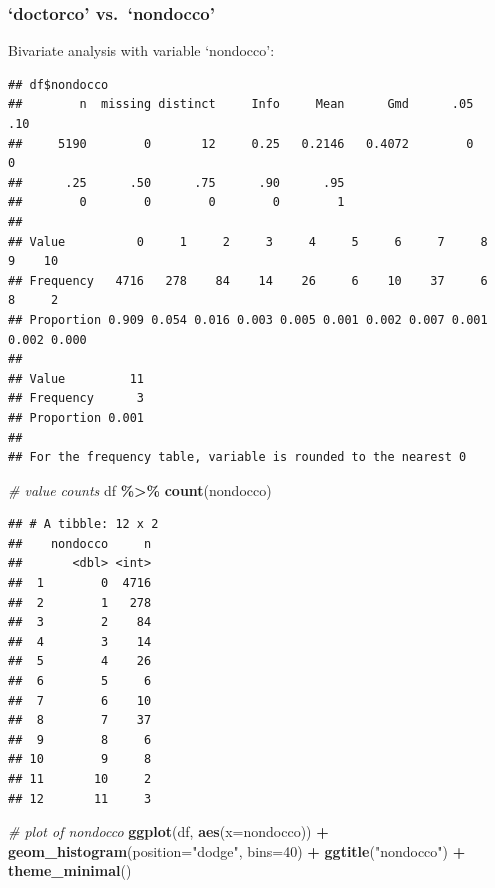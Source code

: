\documentclass[
]{article}
\newenvironment{Shaded}{\begin{snugshade}}{\end{snugshade}}
\newcommand{\AttributeTok}[1]{\textcolor[rgb]{0.13,0.29,0.53}{#1}}
\newcommand{\CommentTok}[1]{\textcolor[rgb]{0.56,0.35,0.01}{\textit{#1}}}
\newcommand{\DecValTok}[1]{\textcolor[rgb]{0.00,0.00,0.81}{#1}}
\newcommand{\FunctionTok}[1]{\textcolor[rgb]{0.13,0.29,0.53}{\textbf{#1}}}
\newcommand{\NormalTok}[1]{#1}
\newcommand{\SpecialCharTok}[1]{\textcolor[rgb]{0.81,0.36,0.00}{\textbf{#1}}}
\newcommand{\StringTok}[1]{\textcolor[rgb]{0.31,0.60,0.02}{#1}}
\begin{document}
\subsubsection{`doctorco' vs.~`nondocco'}\label{doctorco-vs.-nondocco}

Bivariate analysis with variable `nondocco':

\begin{Shaded}
\end{Shaded}

\begin{verbatim}
## df$nondocco 
##        n  missing distinct     Info     Mean      Gmd      .05      .10 
##     5190        0       12     0.25   0.2146   0.4072        0        0 
##      .25      .50      .75      .90      .95 
##        0        0        0        0        1 
##                                                                             
## Value          0     1     2     3     4     5     6     7     8     9    10
## Frequency   4716   278    84    14    26     6    10    37     6     8     2
## Proportion 0.909 0.054 0.016 0.003 0.005 0.001 0.002 0.007 0.001 0.002 0.000
##                 
## Value         11
## Frequency      3
## Proportion 0.001
## 
## For the frequency table, variable is rounded to the nearest 0
\end{verbatim}

\begin{Shaded}
\begin{Highlighting}[]
\CommentTok{\# value counts}
\NormalTok{df }\SpecialCharTok{\%\textgreater{}\%} \FunctionTok{count}\NormalTok{(nondocco)}
\end{Highlighting}
\end{Shaded}

\begin{verbatim}
## # A tibble: 12 x 2
##    nondocco     n
##       <dbl> <int>
##  1        0  4716
##  2        1   278
##  3        2    84
##  4        3    14
##  5        4    26
##  6        5     6
##  7        6    10
##  8        7    37
##  9        8     6
## 10        9     8
## 11       10     2
## 12       11     3
\end{verbatim}

\begin{Shaded}
\begin{Highlighting}[]
\CommentTok{\# plot of nondocco}
\FunctionTok{ggplot}\NormalTok{(df, }\FunctionTok{aes}\NormalTok{(}\AttributeTok{x=}\NormalTok{nondocco)) }\SpecialCharTok{+}
  \FunctionTok{geom\_histogram}\NormalTok{(}\AttributeTok{position=}\StringTok{"dodge"}\NormalTok{, }\AttributeTok{bins=}\DecValTok{40}\NormalTok{) }\SpecialCharTok{+}
  \FunctionTok{ggtitle}\NormalTok{(}\StringTok{"nondocco"}\NormalTok{) }\SpecialCharTok{+}
  \FunctionTok{theme\_minimal}\NormalTok{()}
\end{Highlighting}
\end{Shaded}
\end{document}
